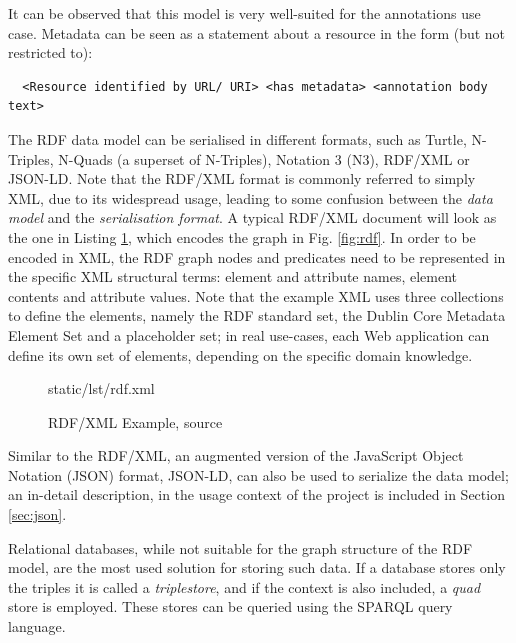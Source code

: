 It can be observed that this model is very well-suited for the annotations use
case. Metadata can be seen as a statement about a resource in the form (but
not restricted to):

\begin{verbatim}
  <Resource identified by URL/ URI> <has metadata> <annotation body text>
\end{verbatim}

The RDF data model can be serialised in different formats, such as Turtle,
N-Triples, N-Quads (a superset of N-Triples), Notation 3 (N3), RDF/XML or
JSON-LD. Note that the RDF/XML format is commonly referred to simply XML, due
to its widespread usage, leading to some confusion between the \textit{data
  model} and the \textit{serialisation format}. A typical RDF/XML document will
look as the one in Listing \ref{lst:rdf}, which encodes the graph in Fig.
\ref{fig:rdf}. In order to be encoded in XML, the RDF graph nodes
and predicates need to be represented in the specific XML structural terms:
element and attribute names, element contents and attribute values. Note that
the example XML uses three collections to define the elements, namely the RDF
standard set, the Dublin Core Metadata Element Set \cite{ref:dc} and a
placeholder set; in real use-cases, each Web application can define its own set
of elements, depending on the specific domain knowledge.

\begin{figure}[!ht]
  
    {static/lst/rdf.xml}
    \caption[RDF/XML Example]
            {RDF/XML Example, source \cite{ref:rdfsyntax}}
    \label{lst:rdf}
\end{figure}

Similar to the RDF/XML, an augmented version of the JavaScript Object Notation
(JSON) format, JSON-LD, can also be used to serialize the data model; an
in-detail description, in the usage context of the project is included in
Section \ref{sec:json}.

Relational databases, while not suitable for the graph structure of the RDF
model, are the most used solution for storing such data. If a database stores
only the triples it is called a \textit{triplestore}, and if the context is
also included, a \textit{quad} store is employed. These stores can be queried
using the SPARQL \cite{ref:sparql} query language.

